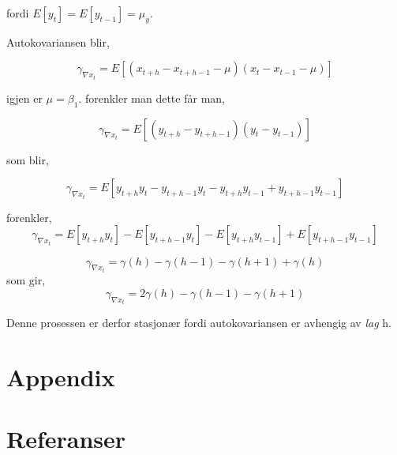 \documentclass[10pt]{article}
\begin{document}
{fordi $E[y_{t}] = E[y_{t-1}] = \mu_{y}$.

Autokovariansen blir,

  \begin{equation*}
  \gamma_{\nabla x_{t}} = E[(x_{t+h} - x_{t+h - 1} - \mu)(x_{t} - x_{t- 1} - \mu)]
\end{equation*}

igjen er $\mu = \beta_{1}$. forenkler man dette får man,

  \begin{equation*}
  \gamma_{\nabla x_{t}} = E[(y_{t+h} - y_{t+h-1})(y_{t} - y_{t-1})]
\end{equation*}

som blir,

   \begin{equation*}
  \gamma_{\nabla x_{t}} = E[y_{t+h}y_{t} - y_{t+h-1}y_{t} - y_{t+h}y_{t-1} + y_{t+h-1}y_{t-1}]
\end{equation*}

forenkler,
\begin{equation*}
  \gamma_{\nabla x_{t}} = E[y_{t+h}y_{t}] - E[y_{t+h-1}y_{t}] - E[y_{t+h}y_{t-1}] + E[y_{t+h-1}y_{t-1}]
\end{equation*}

\begin{equation*}
  \gamma_{\nabla x_{t}} = \gamma(h) - \gamma(h - 1) - \gamma(h + 1) + \gamma(h)
\end{equation*}
som gir,
\begin{equation*}
  \gamma_{\nabla x_{t}} = 2\gamma(h) - \gamma(h - 1) - \gamma(h + 1)
\end{equation*}

Denne prosessen er derfor stasjonær fordi autokovariansen er avhengig av \emph{lag} h.







\newpage
\section{Appendix}
\section{Referanser}
\begingroup
\renewcommand{\section}[2]{}%


\endgroup


 
\end{document}
